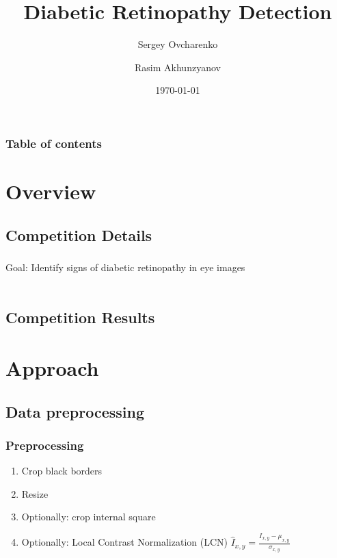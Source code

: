 \documentclass{beamer}
\begin{document}
\title{Diabetic Retinopathy Detection}
\subtitle{}  
\author[]{Sergey Ovcharenko  \and Rasim Akhunzyanov }

\date{\today} 

\begin{frame}
\titlepage
\end{frame}

\begin{frame}
\frametitle{Table of contents}\tableofcontents
\end{frame} 


\section{Overview} 

\begin{frame}
\subsection{Competition Details}\frametitle{} 
\par Goal: Identify signs of diabetic retinopathy in eye images \\~\\
\end{frame}

\subsection{Competition Results}


\section{Approach} 
\subsection{Data preprocessing}
\begin{frame}\frametitle{Preprocessing}

\begin{enumerate}
\item Crop black borders
\item Resize
\item Optionally: crop internal square
\item Optionally: Local Contrast Normalization (LCN) $ \hat{I}_{x,y} = \frac{I_{x,y} - \mu_{x,y}}{\sigma_{x,y}} $
\end{enumerate}

\end{frame}
\end{document}
